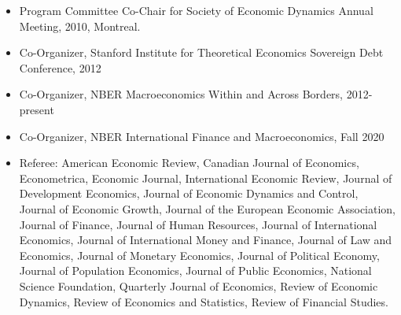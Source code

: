 \documentclass[12pt]{article}
\begin{document}
 \begin{itemize}[left=0pt .. \parindent, label=]

\item Program Committee Co-Chair for Society of Economic Dynamics Annual
 Meeting, 2010, Montreal.

 \item Co-Organizer, Stanford Institute for Theoretical Economics Sovereign
 Debt Conference, 2012
 
 \item Co-Organizer, NBER Macroeconomics Within and Across Borders,
 2012-present
 
 \item Co-Organizer, NBER International Finance and Macroeconomics,
 Fall 2020
  
      
 \item Referee: American Economic Review, Canadian Journal of Economics,
 Econometrica, Economic Journal, International Economic Review, Journal
 of Development Economics, Journal of Economic Dynamics and Control,
 Journal of Economic Growth, Journal of the European Economic
 Association, Journal of Finance, Journal of Human Resources, Journal of
 International Economics, Journal of International Money and Finance,
 Journal of Law and Economics, Journal of Monetary Economics, Journal of
 Political Economy, Journal of Population Economics, Journal of Public
 Economics, National Science Foundation, Quarterly Journal of Economics,
 Review of Economic Dynamics, Review of Economics and Statistics, Review
 of Financial Studies.
 
\end{itemize}
\end{document}

